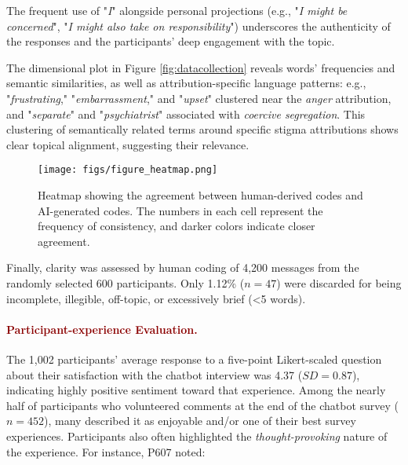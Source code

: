 The frequent use of "\textit{I}" alongside personal projections (e.g., "\textit{I might be concerned}", "\textit{I might also take on responsibility}") underscores the authenticity of the responses and the participants' deep engagement with the topic.




The dimensional plot in Figure \ref{fig:datacollection} reveals words' frequencies and semantic similarities, as well as attribution-specific language patterns: e.g., "\textit{frustrating}," "\textit{embarrassment}," and "\textit{upset}" clustered near the \textit{anger} attribution, and "\textit{separate}" and "\textit{psychiatrist}" associated with \textit{coercive segregation}. 
This clustering of semantically related terms around specific stigma attributions shows clear topical alignment, suggesting their relevance.

\begin{figure}
    \centering
    \texttt{[image: figs/figure\_heatmap.png]}
    \caption{Heatmap showing the agreement between human-derived codes and AI-generated codes. 
    The numbers in each cell represent the frequency of consistency, and darker colors indicate closer agreement.}
    \label{fig:heatmap}
\end{figure}



Finally, clarity was assessed by human coding of 4,200 messages from the randomly selected 600 participants. 
Only 1.12\% ($n=47$) were discarded for being incomplete, illegible, off-topic, or excessively brief (<5 words). 


\paragraph{\textcolor{darkred}{\textbf{Participant-experience Evaluation.}}}
The 1,002 participants' average response to a five-point Likert-scaled question about their satisfaction with the chatbot interview was 4.37 ($SD = 0.87$), indicating highly positive sentiment toward that experience. 
Among the nearly half of participants who volunteered comments at the end of the chatbot survey ($n=452$), many described it as enjoyable and/or one of their best survey experiences. 
Participants also often highlighted the \textit{thought-provoking} nature of the experience. 
For instance, P607 noted:


